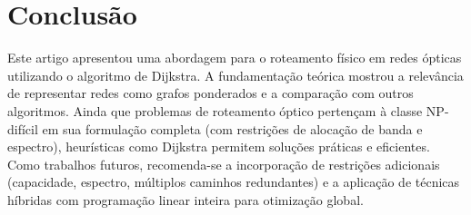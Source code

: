 \section{Conclusão} \label{sec:conclusion}

Este artigo apresentou uma abordagem para o roteamento físico em redes ópticas
utilizando o algoritmo de Dijkstra. A fundamentação teórica mostrou a
relevância de representar redes como grafos ponderados e a comparação com
outros algoritmos. Ainda que problemas de roteamento óptico pertençam à classe
NP-difícil em sua formulação completa (com restrições de alocação de banda e
espectro), heurísticas como Dijkstra permitem soluções práticas e eficientes.
Como trabalhos futuros, recomenda-se a incorporação de restrições adicionais
(capacidade, espectro, múltiplos caminhos redundantes) e a aplicação de
técnicas híbridas com programação linear inteira para otimização global.
